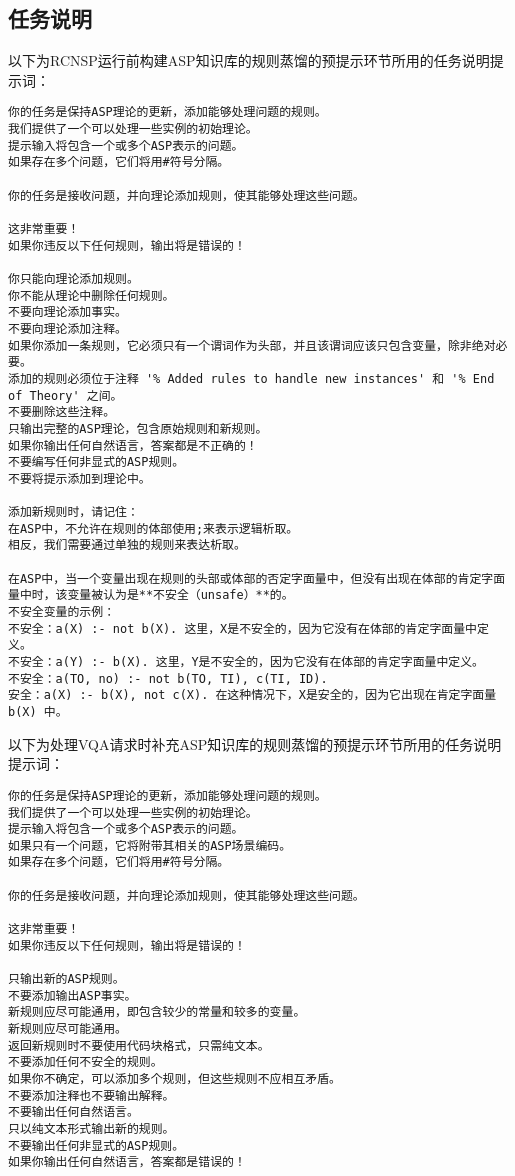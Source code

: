 \subsection{任务说明}
\label{appendix:task-explanation}
以下为RCNSP运行前构建ASP知识库的规则蒸馏的预提示环节所用的任务说明提示词：
\begin{lstlisting}
你的任务是保持ASP理论的更新，添加能够处理问题的规则。
我们提供了一个可以处理一些实例的初始理论。
提示输入将包含一个或多个ASP表示的问题。
如果存在多个问题，它们将用#符号分隔。

你的任务是接收问题，并向理论添加规则，使其能够处理这些问题。

这非常重要！
如果你违反以下任何规则，输出将是错误的！

你只能向理论添加规则。
你不能从理论中删除任何规则。
不要向理论添加事实。
不要向理论添加注释。
如果你添加一条规则，它必须只有一个谓词作为头部，并且该谓词应该只包含变量，除非绝对必要。
添加的规则必须位于注释 '% Added rules to handle new instances' 和 '% End of Theory' 之间。
不要删除这些注释。
只输出完整的ASP理论，包含原始规则和新规则。
如果你输出任何自然语言，答案都是不正确的！
不要编写任何非显式的ASP规则。
不要将提示添加到理论中。

添加新规则时，请记住：
在ASP中，不允许在规则的体部使用;来表示逻辑析取。
相反，我们需要通过单独的规则来表达析取。

在ASP中，当一个变量出现在规则的头部或体部的否定字面量中，但没有出现在体部的肯定字面量中时，该变量被认为是**不安全（unsafe）**的。
不安全变量的示例：
不安全：a(X) :- not b(X). 这里，X是不安全的，因为它没有在体部的肯定字面量中定义。
不安全：a(Y) :- b(X). 这里，Y是不安全的，因为它没有在体部的肯定字面量中定义。
不安全：a(TO, no) :- not b(TO, TI), c(TI, ID).
安全：a(X) :- b(X), not c(X). 在这种情况下，X是安全的，因为它出现在肯定字面量 b(X) 中。
\end{lstlisting}
以下为处理VQA请求时补充ASP知识库的规则蒸馏的预提示环节所用的任务说明提示词：
\begin{lstlisting}
你的任务是保持ASP理论的更新，添加能够处理问题的规则。
我们提供了一个可以处理一些实例的初始理论。
提示输入将包含一个或多个ASP表示的问题。
如果只有一个问题，它将附带其相关的ASP场景编码。
如果存在多个问题，它们将用#符号分隔。

你的任务是接收问题，并向理论添加规则，使其能够处理这些问题。

这非常重要！
如果你违反以下任何规则，输出将是错误的！

只输出新的ASP规则。
不要添加输出ASP事实。
新规则应尽可能通用，即包含较少的常量和较多的变量。
新规则应尽可能通用。
返回新规则时不要使用代码块格式，只需纯文本。
不要添加任何不安全的规则。
如果你不确定，可以添加多个规则，但这些规则不应相互矛盾。
不要添加注释也不要输出解释。
不要输出任何自然语言。
只以纯文本形式输出新的规则。
不要输出任何非显式的ASP规则。
如果你输出任何自然语言，答案都是错误的！
\end{lstlisting}

